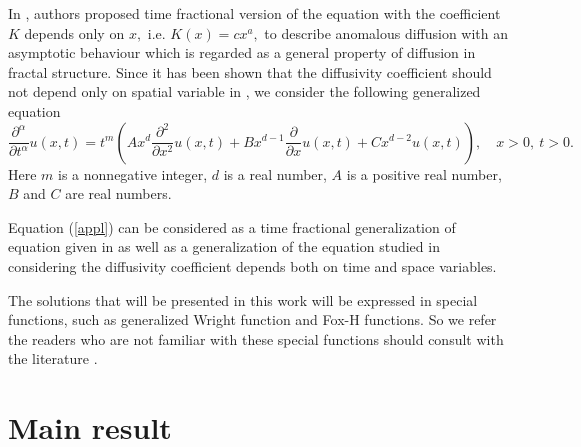 \documentclass[12pt]{article}
\theoremstyle{definition}
\begin{document}
In \cite{metz94}, authors proposed time fractional version of the equation with the coefficient $K$ depends only on $x,$ i.e. $K(x)=cx^a,$ to describe anomalous diffusion with an asymptotic behaviour which is regarded as a general property of diffusion in fractal structure. Since it has been shown that the diffusivity coefficient should not depend only on spatial variable in \cite{hents}, we consider the following generalized equation
\begin{equation}\label{appl}
\frac{\partial^\alpha}{\partial t^\alpha}u(x,t)=
  t^m\left(Ax^{d}\frac{\partial^2}{\partial x^2}u(x,t)+Bx^{d-1}\frac{\partial}{\partial x}u(x,t)+Cx^{d-2}u(x,t)\right),\quad x>0,~ t>0.  
\end{equation}
Here $m$ is a nonnegative integer, $d$ is a real number, $A$ is a positive real number, $B$ and $C$ are real numbers.

Equation (\ref{appl}) can be considered as a time fractional generalization of equation given in \cite{hents} as well as a generalization of the equation studied in \cite{metz94} considering the diffusivity coefficient depends both on time and space variables.

The solutions that will be presented in this work will be expressed in special functions, such as generalized Wright function and Fox-H functions. So we refer the readers who are not familiar with these special functions should consult with the literature \cite{Hnom1,Hnom2}.

\section{Main result}
\end{document}
